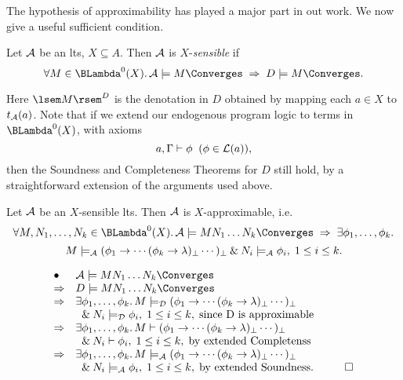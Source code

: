 The hypothesis of approximability has played a major part in out work. We now give a useful sufficient condition.

\begin{definition}
{\rm Let $\cal A$ be an lts, $X \subseteq A$. Then $\cal A$ is $X$-{\em sensible} if}
\[ \forall M \in {\BLambda}^{0}(X). \, {\cal A} \models M \Converges \; \Rightarrow \; D \models M \Converges . \]
\end{definition}

Here $\lsem M \rsem^{D}$ is the denotation in $D$ obtained by mapping each $a \in X$ to $t_{\cal A}(a)$. Note that if we extend our endogenous program logic to terms in ${\BLambda}^{0}(X)$, with axioms
\[ a, \Gamma \vdash \phi \;\; ( \phi \in {\cal L}(a)) , \]
then the Soundness and Completeness Theorems for $D$ still hold, by a straightforward extension of the arguments used above.

\begin{proposition}
\label{approxl}
Let $\cal A$ be an $X$-sensible lts. Then $\cal A$ is $X$-approximable, i.e.
\[ \forall M, N_{1} , \ldots , N_{k} \in {\BLambda}^{0}(X) . \, {\cal A} \models M N_{1} \ldots N_{k} \Converges \; \Rightarrow \; \exists \phi_{1} , \ldots , \phi_{k} . \]
\[ M \models_{\cal A} (\phi_{1} \rightarrow \cdots (\phi_{k} \rightarrow \lambda )_{\bot} \cdots )_{\bot} \: \& \: N_{i} \models_{\cal A} \phi_{i}, \; 1 \leq i \leq k . \]
\end{proposition}

\proof 
\[ \begin{array}{ll}
\bullet & {\cal A} \models M N_{1} \ldots N_{k} \Converges \\
\Rightarrow & D \models M  N_{1} \ldots N_{k} \Converges \\
\Rightarrow &  \exists \phi_{1} , \ldots , \phi_{k} . \,  M \models_{\cal D} (\phi_{1} \rightarrow \cdots (\phi_{k} \rightarrow \lambda )_{\bot} \cdots )_{\bot} \\
& \;\; \& \: N_{i} \models_{\cal D} \phi_{i}, \; 1 \leq i \leq k , \; \mbox{since {D} is approximable} \\
\Rightarrow & \exists \phi_{1} , \ldots , \phi_{k} . \,  M \vdash (\phi_{1} \rightarrow \cdots (\phi_{k} \rightarrow \lambda )_{\bot} \cdots )_{\bot} \\
& \;\; \& \: N_{i} \vdash \phi_{i}, \; 1 \leq i \leq k , \; \mbox{by extended Completenss} \\
\Rightarrow & \exists \phi_{1} , \ldots , \phi_{k} . \,  M \models_{\cal A} (\phi_{1} \rightarrow \cdots (\phi_{k} \rightarrow \lambda )_{\bot} \cdots )_{\bot} \\
& \;\; \& \: N_{i} \models_{\cal A} \phi_{i}, \; 1 \leq i \leq k , \; \mbox{by extended Soundness} . \;\;\; \qed
\end{array} \]

